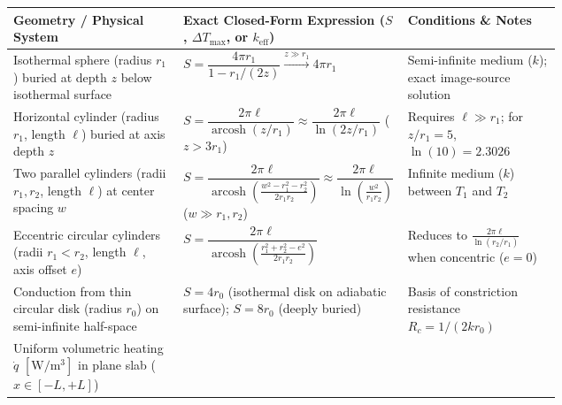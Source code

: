 \par\smallskip\noindent
\begin{minipage}{\linewidth}
\label{tab:10:shape-factors}
\footnotesize
\setlength{\tabcolsep}{4pt}
\renewcommand{\arraystretch}{1.12}
\begin{tabularx}{\linewidth}{@{}L{0.31\linewidth} L{0.41\linewidth} X@{}}
\toprule
\textbf{Geometry / Physical System} & \textbf{Exact Closed-Form Expression ($S$, $\Delta T_{\max}$, or $k_{\mathrm{eff}}$)} & \textbf{Conditions \& Notes} \\
\midrule
Isothermal sphere (radius $r_1$) buried at depth $z$ below isothermal surface &
  $S = \dfrac{4\pi r_1}{1 - r_1/(2z)} \xrightarrow{z \gg r_1} 4\pi r_1$ &
  Semi-infinite medium ($k$); exact image-source solution \\
Horizontal cylinder (radius $r_1$, length $\ell$) buried at axis depth $z$ &
  $S = \dfrac{2\pi \ell}{\operatorname{arcosh}(z/r_1)} \approx \dfrac{2\pi \ell}{\ln(2z/r_1)}$ \quad ($z > 3r_1$) &
  Requires $\ell \gg r_1$; for $z/r_1 = 5$, $\ln(10) = 2.3026$ \\
Two parallel cylinders (radii $r_1, r_2$, length $\ell$) at center spacing $w$ &
  $S = \dfrac{2\pi \ell}{\operatorname{arcosh}\!\left(\frac{w^2 - r_1^2 - r_2^2}{2r_1 r_2}\right)} \approx \dfrac{2\pi \ell}{\ln\!\left(\frac{w^2}{r_1 r_2}\right)}$ ($w \gg r_1,r_2$) &
  Infinite medium ($k$) between $T_1$ and $T_2$ \\
Eccentric circular cylinders (radii $r_1 < r_2$, length $\ell$, axis offset $e$) &
  $S = \dfrac{2\pi \ell}{\operatorname{arcosh}\!\left(\frac{r_1^2 + r_2^2 - e^2}{2r_1 r_2}\right)}$ &
  Reduces to $\frac{2\pi\ell}{\ln(r_2/r_1)}$ when concentric ($e = 0$) \\
Conduction from thin circular disk (radius $r_0$) on semi-infinite half-space &
  $S = 4 r_0$ \quad (isothermal disk on adiabatic surface); $S = 8 r_0$ (deeply buried) &
  Basis of constriction resistance $R_c = 1/(2 k r_0)$ \\
Uniform volumetric heating $\dot{q}$ $[\si{\watt\per\cubic\meter}]$ in plane slab ($x \in [-L, +L]$) &

\end{tabularx}
\end{minipage}
